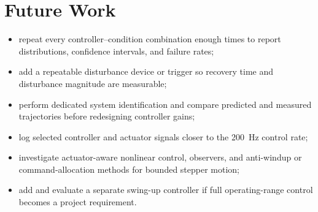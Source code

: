 \section{Future Work}
\begin{itemize}
  \item repeat every controller--condition combination enough times to report
  distributions, confidence intervals, and failure rates;
  \item add a repeatable disturbance device or trigger so recovery time and
  disturbance magnitude are measurable;
  \item perform dedicated system identification and compare predicted and
  measured trajectories before redesigning controller gains;
  \item log selected controller and actuator signals closer to the
  \SI{200}{Hz} control rate;
  \item investigate actuator-aware nonlinear control, observers, and
  anti-windup or command-allocation methods for bounded stepper motion;
  \item add and evaluate a separate swing-up controller if full operating-range
  control becomes a project requirement.
\end{itemize}

